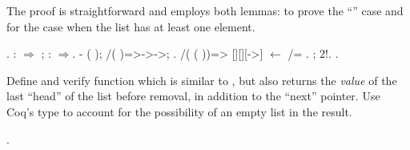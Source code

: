 The proof is straightforward and employs both lemmas:  to
prove the ``'' case and  for the case when the list has
at least one element.
\begin{coqdoccode}
\coqdocemptyline
\coqdocnoindent
{} .\coqdoceol
\coqdocnoindent
{}: \ensuremath{\Rightarrow}   ; :  \ensuremath{\Rightarrow}.\coqdoceol
\coqdocnoindent
-   ( ); /( )=>->->; .\coqdoceol
\coqdocnoindent
{}/( ( ))=> [][][->] \ensuremath{\leftarrow} /= .\coqdoceol
\coqdocnoindent
{} ;  2!.\coqdoceol
\coqdocnoindent
{}.\coqdoceol
\coqdocemptyline
\end{coqdoccode}


\begin{exercise}
Define and verify function  which is similar to ,
but also returns the \textit{value} of the last ``head'' of the list before
removal, in addition to the ``next'' pointer. Use Coq's  type to
account for the possibility of an empty list in the result.
\end{exercise}
\begin{coqdoccode}
\coqdocemptyline
\coqdocemptyline
\coqdocnoindent
{} .\coqdoceol
\coqdocemptyline
\end{coqdoccode}


